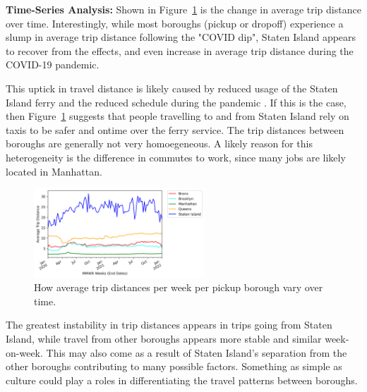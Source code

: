 \documentclass[11pt]{article}
\begin{document}
\begin{multicols}{2}

    \textbf{Time-Series Analysis:}
    Shown in Figure~\ref{fig:ts} is the change in average trip distance over time. Interestingly, 
    while most boroughs (pickup or dropoff) experience a slump in average trip distance following the "COVID dip", 
    Staten Island appears to recover from the effects, and even increase in average trip distance
    during the COVID-19 pandemic.

This uptick in travel distance is likely caused by reduced usage of the Staten Island ferry and the reduced schedule during the pandemic \cite{dot2020}.
If this is the case, then Figure~\ref{fig:ts} suggests that people travelling to and from Staten Island rely on taxis to be safer and ontime over the ferry service.
The trip distances between boroughs are generally not very homoegeneous. 
A likely reason for this heterogeneity is the difference in commutes to work, since
many jobs are likely located in Manhattan.

\begin{figure}[H]

    \centering

    \includegraphics[width=0.57\textwidth]{../plots/time-series-Average Trip Distance-vs-MMWR Weeks (End Dates)-by-pu_borough.png}
    \caption{How average trip distances per week per pickup borough vary over time.} %

    \label{fig:ts}
\end{figure}
\end{multicols}

The greatest instability in trip distances appears in trips going from Staten Island,
while travel from other boroughs appears more stable and similar week-on-week. 
This may also come as a result of Staten Island's separation from the other boroughs
contributing to many possible factors.
Something as simple as culture could play a roles in differentiating the travel patterns between boroughs.
\end{document}
